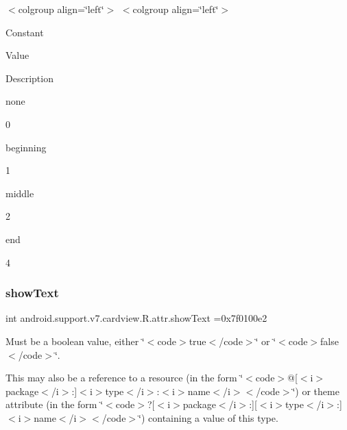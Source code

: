 \tabulinesep=1mm
\begin{longtabu} spread 0pt [c]{*{0}{|X[-1]}|}
\hline
\end{longtabu}
$<$colgroup align=\char`\"{}left\char`\"{}$>$ $<$colgroup align=\char`\"{}left\char`\"{}$>$ 

Constant

Value

Description 

{\ttfamily none}

0

{\ttfamily beginning}

1

{\ttfamily middle}

2

{\ttfamily end}

4\mbox{\label{classandroid_1_1support_1_1v7_1_1cardview_1_1R_1_1attr_a6d1cb415e3b1eef3bcb5ec2ac578c03a}} 
\subsubsection{\texorpdfstring{show\+Text}{showText}}
{\footnotesize\ttfamily int android.\+support.\+v7.\+cardview.\+R.\+attr.\+show\+Text =0x7f0100e2\hspace{0.3cm}{\ttfamily [static]}}

Must be a boolean value, either \char`\"{}$<$code$>$true$<$/code$>$\char`\"{} or \char`\"{}$<$code$>$false$<$/code$>$\char`\"{}. 

This may also be a reference to a resource (in the form \char`\"{}$<$code$>$@\mbox{[}$<$i$>$package$<$/i$>$\+:\mbox{]}$<$i$>$type$<$/i$>$\+:$<$i$>$name$<$/i$>$$<$/code$>$\char`\"{}) or theme attribute (in the form \char`\"{}$<$code$>$?\mbox{[}$<$i$>$package$<$/i$>$\+:\mbox{]}\mbox{[}$<$i$>$type$<$/i$>$\+:\mbox{]}$<$i$>$name$<$/i$>$$<$/code$>$\char`\"{}) containing a value of this type. \mbox{\label{classandroid_1_1support_1_1v7_1_1cardview_1_1R_1_1attr_a02adf6c7fe6e46d761997a19ab266467}} 
